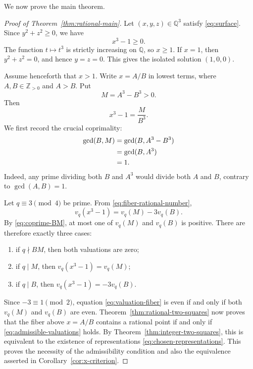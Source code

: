 \documentclass[11pt,a4paper]{article}
\numberwithin{equation}{section}
\theoremstyle{definition}
\theoremstyle{remark}
\newcommand{\Z}{\mathbb Z}
\newcommand{\Q}{\mathbb Q}
\newcommand{\divides}{\mathrel{|}}
\newcommand{\ndivides}{\mathrel{\nmid}}
\begin{document}
We now prove the main theorem.

\begin{proof}[Proof of Theorem~\ref{thm:rational-main}]
Let $(x,y,z)\in\Q^3$ satisfy \eqref{eq:surface}. Since $y^2+z^2\geq0$, we have
\[
 x^3-1\geq0.
\]
The function $t\mapsto t^3$ is strictly increasing on $\Q$, so $x\geq1$. If $x=1$, then $y^2+z^2=0$, and hence $y=z=0$. This gives the isolated solution $(1,0,0)$.

Assume henceforth that $x>1$. Write $x=A/B$ in lowest terms, where $A,B\in\Z_{>0}$ and $A>B$. Put
\[
 M=A^3-B^3>0.
\]
Then
\begin{equation}
 x^3-1=\frac{M}{B^3}.
 \label{eq:fiber-rational-number}
\end{equation}
We first record the crucial coprimality:
\begin{align}
 \gcd(B,M)
 &=\gcd(B,A^3-B^3)\notag\\
 &=\gcd(B,A^3)\notag\\
 &=1.
 \label{eq:coprime-BM}
\end{align}
Indeed, any prime dividing both $B$ and $A^3$ would divide both $A$ and $B$, contrary to $\gcd(A,B)=1$.

Let $q\equiv3\pmod4$ be prime. From \eqref{eq:fiber-rational-number},
\begin{equation}
 v_q(x^3-1)=v_q(M)-3v_q(B).
 \label{eq:valuation-fiber}
\end{equation}
By \eqref{eq:coprime-BM}, at most one of $v_q(M)$ and $v_q(B)$ is positive. There are therefore exactly three cases:
\begin{enumerate}[label=\textup{(\roman*)}]
 \item if $q\ndivides BM$, then both valuations are zero;
 \item if $q\divides M$, then $v_q(x^3-1)=v_q(M)$;
 \item if $q\divides B$, then $v_q(x^3-1)=-3v_q(B)$.
\end{enumerate}
Since $-3\equiv1\pmod2$, equation \eqref{eq:valuation-fiber} is even if and only if both $v_q(M)$ and $v_q(B)$ are even. Theorem~\ref{thm:rational-two-squares} now proves that the fiber above $x=A/B$ contains a rational point if and only if \eqref{eq:admissible-valuations} holds. By Theorem~\ref{thm:integer-two-squares}, this is equivalent to the existence of representations \eqref{eq:chosen-representations}. This proves the necessity of the admissibility condition and also the equivalence asserted in Corollary~\ref{cor:x-criterion}.


\end{proof}
\end{document}

